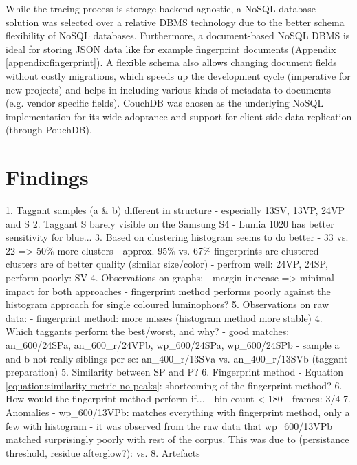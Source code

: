 \documentclass[thesis.tex]{subfiles}
\begin{document}
While the tracing process is storage backend agnostic, a NoSQL database solution was selected over a relative DBMS technology due to the better schema flexibility of NoSQL databases. Furthermore, a document-based NoSQL DBMS is ideal for storing JSON data like for example fingerprint documents (Appendix \ref{appendix:fingerprint}). A flexible schema also allows changing document fields without costly migrations, which speeds up the development cycle (imperative for new projects) and helps in including various kinds of metadata to documents (e.g. vendor specific fields). CouchDB was chosen as the underlying NoSQL implementation for its wide adoptance and support for client-side data replication (through PouchDB).

\section{Findings}
\label{chapter:findings}

1. Taggant samples (a \& b) different in structure
  - especially 13SV, 13VP, 24VP and S
2. Taggant S barely visible on the Samsung S4
  - Lumia 1020 has better sensitivity for blue...
3. Based on clustering histogram seems to do better
  - 33 vs. 22 => 50\% more clusters
  - approx. 95\% vs. 67\% fingerprints are clustered
  - clusters are of better quality (similar size/color)
  - perfrom well: 24VP, 24SP, perform poorly: SV
4. Observations on graphs:
  - margin increase => minimal impact for both approaches
  - fingerprint method performs poorly against the histogram approach for single coloured luminophors?
5. Observations on raw data:
  - fingerprint method: more misses (histogram method more stable)
4. Which taggants perform the best/worst, and why?
  - good matches: an\_600/24SPa, an\_600\_r/24VPb, wp\_600/24SPa, wp\_600/24SPb
  - sample a and b not really siblings per se: an\_400\_r/13SVa vs. an\_400\_r/13SVb (taggant preparation)
5. Similarity between SP and P?
6. Fingerprint method
  - Equation \ref{equation:similarity-metric-no-peaks}: shortcoming of the fingerprint method?
6. How would the fingerprint method perform if...
  - bin count < 180
  - frames: 3/4
7. Anomalies
  - wp\_600/13VPb: matches everything with fingerprint method, only a few with histogram
  - it was observed from the raw data that wp\_600/13VPb matched surprisingly poorly with rest of the corpus. This was due to (persistance threshold, residue afterglow?):
    vs.
8. Artefacts
\end{document}
